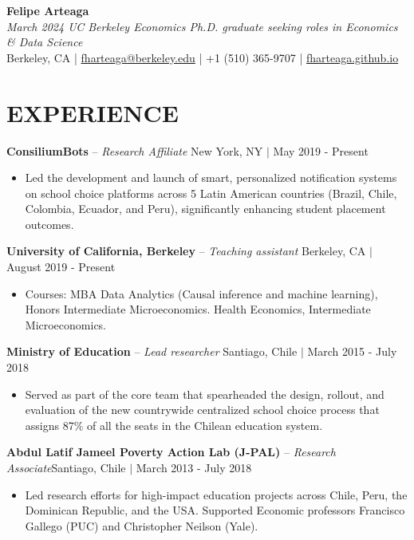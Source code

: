 \documentclass[letter,9pt]{extarticle}
\begin{document}
\pagestyle{empty}



\begin{center}
{\Large \textbf{Felipe Arteaga}}\\[2pt] %
\textit{March 2024 UC Berkeley Economics Ph.D. graduate seeking roles in Economics \& Data Science}\\[3pt]
Berkeley, CA | \href{mailto:fharteaga@berkeley.edu}{fharteaga@berkeley.edu} | +1 (510) 365-9707 | \href{https://fharteaga.github.io/}{fharteaga.github.io} 
\end{center}

\section*{EXPERIENCE}
\noindent
\textbf{ConsiliumBots} -- \textit{Research Affiliate}  \hfill New York, NY $|$ May 2019 - Present %
\begin{itemize}
    \item Led the development and launch of smart, personalized notification systems on school choice platforms across 5 Latin American countries (Brazil, Chile, Colombia, Ecuador, and Peru), significantly enhancing student placement outcomes.  %
\end{itemize}
\noindent
\textbf{University of California, Berkeley} -- \textit{Teaching assistant} \hfill Berkeley, CA $|$ August 2019 - Present
\begin{itemize}
    \item Courses: MBA Data Analytics (Causal inference and machine learning), Honors Intermediate Microeconomics. Health Economics, Intermediate Microeconomics.  %
\end{itemize}
\noindent
\textbf{Ministry of Education} -- \textit{Lead researcher}  \hfill Santiago, Chile $|$ March 2015 - July 2018 %
\begin{itemize}
    \item Served as part of the core team that spearheaded the design, rollout, and evaluation of the new countrywide centralized school choice process that assigns 87\% of all the seats in the Chilean education system. %
\end{itemize}
\noindent
\textbf{Abdul Latif Jameel Poverty Action Lab (J-PAL)} -- \textit{Research Associate}\hfill Santiago, Chile $|$ March 2013 - July 2018 %
\begin{itemize}
    \item Led research efforts for high-impact education projects across Chile, Peru, the Dominican Republic, and the USA. Supported Economic professors Francisco Gallego (PUC) and Christopher Neilson (Yale).
\end{itemize}
\end{document}
